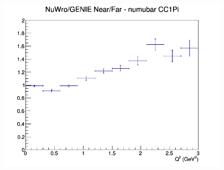 \documentclass[12pt]{article}
\begin{document}
\begin{figure}[h]
\endminipage
{}
\includegraphics[width=\linewidth]{eff_Q2/FGT/ratios/CC1Pi_NuWro_GENIE_numubar_NF_Q2.png}
\endminipage
\newline
\end{figure}
\clearpage
\end{document}
